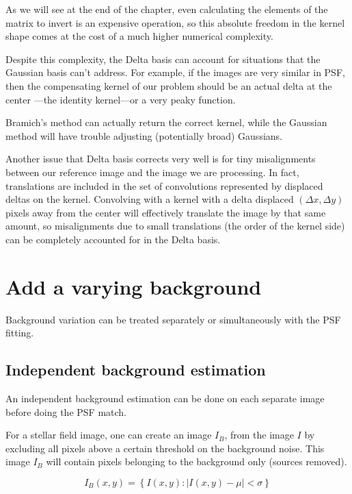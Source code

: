 As we will see at the end of the chapter, even calculating the elements of the matrix to invert is an expensive operation,
so this absolute freedom in the kernel shape comes at the cost of a much higher numerical complexity.

Despite this complexity, the Delta basis can account for situations that the Gaussian basis can't address.
For example, if the images are very similar in PSF, then the compensating kernel of our problem should be an actual delta at the center 
---the identity kernel---or a very peaky function.

Bramich's method can actually return the correct kernel, while the Gaussian method will have trouble adjusting (potentially broad) Gaussians.

Another issue that Delta basis corrects very well is for tiny misalignments between our reference image and the image we are processing.
In fact, translations are included in the set of convolutions represented by displaced deltas on the kernel.
Convolving with a kernel with a delta displaced $(\Delta x, \Delta y)$ pixels away from the center will effectively translate the image by that same amount,
so misalignments due to small translations (the order of the kernel side) can be completely accounted for in the Delta basis.

\section{Add a varying background}

Background variation can be treated separately or simultaneously with the PSF fitting.

\subsection{Independent background estimation}

An independent background estimation can be done on each separate image before doing the PSF match.

For a stellar field image, one can create an image $I_{B}$, from the image $I$ by excluding all pixels above a certain threshold on the background noise. This image $I_{B}$ will contain pixels belonging to the background only (sources removed).

\begin{equation}
I_{B}(x,y)  = \left\{ I(x,y) : |I(x,y) - \mu| < \sigma \right\}
\end{equation}

